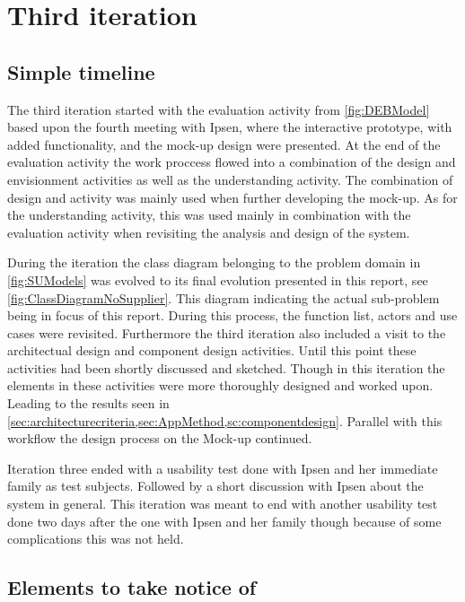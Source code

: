 \section{Third iteration}
\subsection{Simple timeline}\label{sec:3Iteration-timeline}
The third iteration started with the evaluation activity from \cref{fig:DEBModel} based upon the fourth meeting with Ipsen, where the interactive prototype, with added functionality, and the mock-up design were presented.
At the end of the evaluation activity the work proccess flowed into a combination of the design and envisionment activities as well as the understanding activity.
The combination of design and activity was mainly used when further developing the mock-up.
As for the understanding activity, this was used mainly in combination with the evaluation activity when revisiting the analysis and design of the system.

During the iteration the class diagram belonging to the problem domain in \cref{fig:SUModels} was evolved to its final evolution presented in this report, see \cref{fig:ClassDiagramNoSupplier}.
This diagram indicating the actual sub-problem being in focus of this report.
During this process, the function list, actors and use cases were revisited.
Furthermore the third iteration also included a visit to the architectual design and component design activities.
Until this point these activities had been shortly discussed and sketched.
Though in this iteration the elements in these activities were more thoroughly designed and worked upon.
Leading to the results seen in \cref{sec:architecturecriteria,sec:AppMethod,sc:componentdesign}.
Parallel with this workflow the design process on the Mock-up continued.

Iteration three ended with a usability test done with Ipsen and her immediate family as test subjects.
Followed by a short discussion with Ipsen about the system in general.
This iteration was meant to end with another usability test done two days after the one with Ipsen and her family though because of some complications this was not held.

\subsection{Elements to take notice of}
